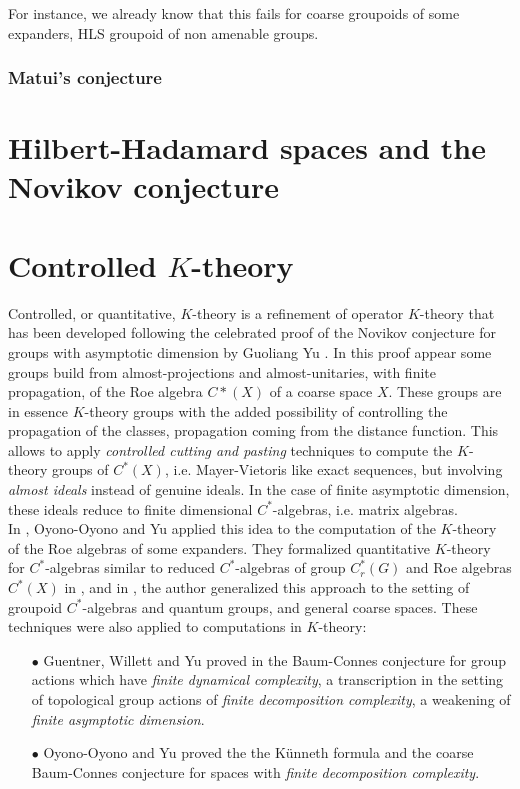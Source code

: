 For instance, we already know that this fails for coarse groupoids of some expanders, HLS groupoid of non amenable groups. 
\subsubsection*{Matui's conjecture}


\section{Hilbert-Hadamard spaces and the Novikov conjecture}

\section{Controlled $K$-theory}

Controlled, or quantitative, $K$-theory is a refinement of operator $K$-theory that has been developed following the celebrated proof of the Novikov conjecture for groups with asymptotic dimension by Guoliang Yu \cite{Yu1}. In this proof appear some groups build from almost-projections and almost-unitaries, with finite propagation, of the Roe algebra $C*(X)$ of a coarse space $X$. These groups are in essence $K$-theory groups with the added possibility of controlling the propagation of the classes, propagation coming from the distance function. This allows to apply \textit{controlled cutting and pasting} techniques to compute the $K$-theory groups of $C^*(X)$, i.e. Mayer-Vietoris like exact sequences, but involving \textit{almost ideals} instead of genuine ideals. In the case of finite asymptotic dimension, these ideals reduce to finite dimensional $C^*$-algebras, i.e. matrix algebras.\\

In \cite{OY1}, Oyono-Oyono and Yu applied this idea to the computation of the $K$-theory of the Roe algebras of some expanders. They formalized quantitative $K$-theory for $C^*$-algebras similar to reduced $C^*$-algebras of group $C^*_r(G)$ and Roe algebras $C^*(X)$ in \cite{OY2}, and in \cite{dell2018controlled}, the author generalized this approach to the setting of groupoid $C^*$-algebras and quantum groups, and general coarse spaces. These techniques were also applied to computations in $K$-theory:\\
\begin{itemize} 
\item[$\bullet$] Guentner, Willett and Yu proved in \cite{GWY2} the Baum-Connes conjecture for group actions which have \textit{finite dynamical complexity}, a transcription in the setting of topological group actions of \textit{finite decomposition complexity}, a weakening of \textit{finite asymptotic dimension}.\\   
\item[$\bullet$] Oyono-Oyono and Yu proved the the K\"unneth formula \cite{oyono2019quantitative} and the coarse Baum-Connes conjecture \cite{} for spaces with \textit{finite decomposition complexity}.\\
\end{itemize}

